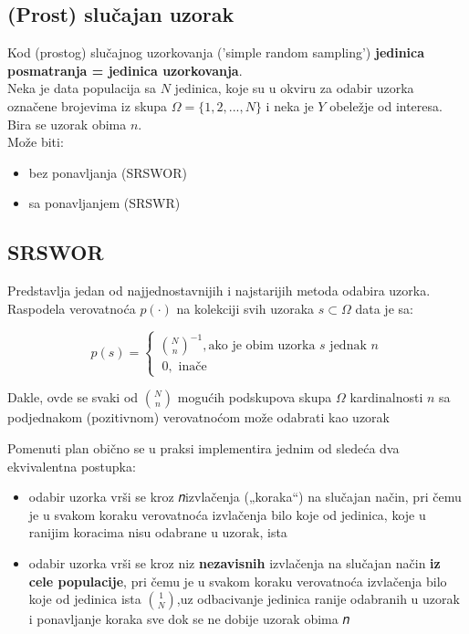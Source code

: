 \documentclass[10pt,a4paper,]{article}
\begin{document}
\subsection{(Prost) slučajan uzorak}
Kod (prostog) slučajnog uzorkovanja ('simple random sampling')
\textbf{jedinica posmatranja = jedinica uzorkovanja}.
\\
Neka je data populacija sa $N$ jedinica, koje su u okviru za 
odabir uzorka označene brojevima iz skupa $\Omega = \{1, 2, ..., N\}$ i neka je 
$Y$ obeležje od interesa. Bira se uzorak obima $n$.
\\

Može biti:
\begin{itemize}
	\item bez ponavljanja (SRSWOR)
	\item sa ponavljanjem (SRSWR)
\end{itemize}


\subsection{SRSWOR}
Predstavlja jedan od najjednostavnijih i najstarijih metoda odabira 
uzorka.
Raspodela verovatnoća $p(\cdot)$ na kolekciji svih uzoraka $s \subset 
\Omega$ data je sa:

\begin{equation}
p(s) = \begin{cases}
	\binom{N}{n}^{-1}, \text{ako je obim uzorka } s \text{ jednak } n 
	\\[0.2cm]
	\ 0, \text{ inače} 
\end{cases}
\end{equation}


Dakle, ovde se svaki od $\binom{N}{n}$ mogućih podskupova skupa 
 $\Omega$ kardinalnosti $n$ sa 
podjednakom (pozitivnom) verovatnoćom može odabrati kao uzorak


Pomenuti plan obično se u praksi implementira jednim od sledeća dva 
ekvivalentna postupka:
\begin{itemize}
	\item odabir uzorka vrši se kroz 𝑛izvlačenja („koraka“) na 
	slučajan način, pri čemu je u svakom koraku verovatnoća 
	izvlačenja bilo koje od jedinica, koje u ranijim koracima nisu 
	odabrane u uzorak, ista
	\item odabir uzorka vrši se kroz niz \textbf{nezavisnih}
	izvlačenja na 
	slučajan način \textbf{iz cele populacije}, pri čemu je u svakom 
	koraku 
	verovatnoća izvlačenja bilo koje od 
	jedinica ista $\binom{1}{N}$,uz 
	odbacivanje jedinica ranije odabranih u uzorak i ponavljanje 
	koraka sve dok se ne dobije uzorak obima 𝑛
\end{itemize}
\end{document}

